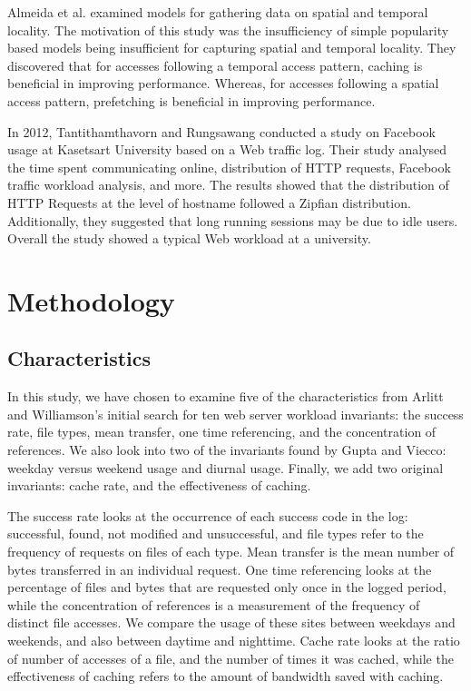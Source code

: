 \documentclass[10pt,conference]{IEEEtran}
\begin{document}
Almeida et al. \cite{reference_locality} examined models for gathering data on spatial and temporal locality. The motivation of this study was the insufficiency of simple popularity based models being insufficient for capturing spatial and temporal locality. They discovered that for accesses following a temporal access pattern, caching is beneficial in improving performance. Whereas, for accesses following a spatial access pattern, prefetching is beneficial in improving performance.

In 2012, Tantithamthavorn and Rungsawang \cite{facebook} conducted a study on Facebook usage at Kasetsart University based on a Web traffic log. Their study analysed the time spent communicating online, distribution of HTTP requests, Facebook traffic workload analysis, and more. The results showed that the distribution of HTTP Requests at the level of hostname followed a Zipfian distribution. Additionally, they suggested that long running sessions may be due to idle users. Overall the study showed a typical Web workload at a university.

\section{Methodology}\label{methodology}
\subsection{Characteristics}\label{lab:characteristics}
In this study, we have chosen to examine five of the characteristics from Arlitt and Williamson's initial search\cite{needed} for ten web server workload invariants: the success rate, file types, mean transfer, one time referencing, and the concentration of references. We also look into two of the invariants found by Gupta and Viecco\cite{needed}: weekday versus weekend usage and diurnal usage. Finally, we add two original invariants: cache rate, and the effectiveness of caching.

The success rate looks at the occurrence of each success code in the log: successful, found, not modified and unsuccessful, and file types refer to the frequency of requests on files of each type. Mean transfer is the mean number of bytes transferred in an individual request. One time referencing looks at the percentage of files and bytes that are requested only once in the logged period, while the concentration of references is a measurement of the frequency of distinct file accesses. We compare the usage of these sites between weekdays and weekends, and also between daytime and nighttime. Cache rate looks at the ratio of number of accesses of a file, and the number of times it was cached, while the effectiveness of caching refers to the amount of bandwidth saved with caching.
\end{document}
